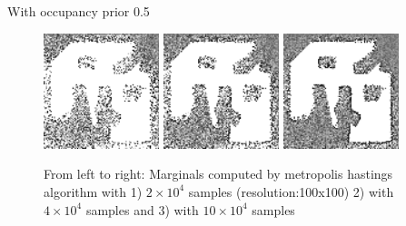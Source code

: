 \documentclass{beamer}
\begin{document}
\begin{frame}
  With occupancy prior 0.5
  \begin{figure}
    \includegraphics[width=0.3\textwidth]{figures/Metropolis_Marginals_20k_iter.png}
    \includegraphics[width=0.3\textwidth]{figures/Metropolis_Marginals_40k_iter.png}
    \includegraphics[width=0.3\textwidth]{figures/metropolis_100x100.png}
    \caption{From left to right: Marginals computed by metropolis hastings algorithm with 1) $2 \times 10^4$ samples (resolution:100x100) 2) with $4 \times 10^4$ samples and 3) with $10 \times 10^4$ samples }
    \label{fig:metropolis-results}
  \end{figure}
\end{frame}
\end{document}
